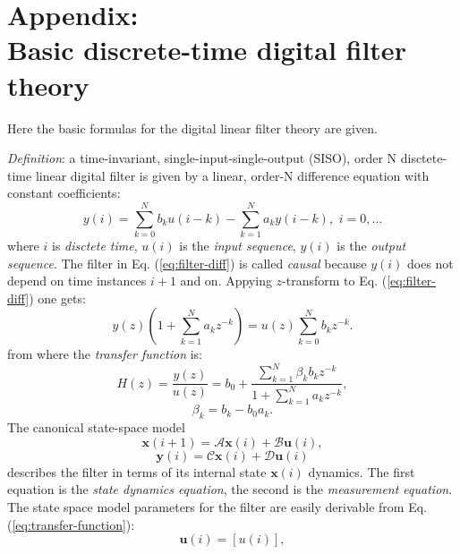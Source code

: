 
\newpage
\section{Appendix: \\ Basic discrete-time digital filter theory}
\label{app:DF}

\mbox{}

Here the basic formulas for the digital linear filter theory are given.

\emph{Definition}: a time-invariant, single-input-single-output (SISO), order N
disctete-time linear digital filter is given by a
linear, order-N difference equation with constant coefficients:
\begin{equation} \label{eq:filter-diff}
	y(i) = \sum_{k=0}^{N} b_{k} u(i-k) - \sum_{k=1}^{N} a_{k} y(i-k), \,\,
	i = 0,...
\end{equation}
where $i$ is \emph{disctete time},  $u(i)$ is the
\emph{input sequence},  $y(i)$ is the \emph{output
sequence}. 
The filter in Eq. (\ref{eq:filter-diff}) is called \emph{causal}  because
$y(i)$ does not depend on time instances $i+1$ and on. Appying $z$-transform
to Eq. (\ref{eq:filter-diff}) one gets:
$$ y(z) (1+\sum_{k=1}^{N} a_{k} z^{-k}) = u(z) \sum_{k=0}^{N} b_{k} z^{-k}. $$
from where the \emph{transfer function}  is:
\begin{equation} \label{eq:transfer-function}
	H(z) = \frac{y(z)}{u(z)} = b_{0} + \frac{\sum_{k=1}^{N} \beta_{k} b_{k}
	z^{-k}}{1+\sum_{k=1}^{N} a_{k} z^{-k}},
\end{equation}
$$ \beta_{k} = b_{k} - b_{0} a_{k}. $$
The canonical state-space model
\begin{equation} \label{eq:canonical-state-space}
	\bm{x}(i+1) = \mathcal{A} \bm{x}(i) + \mathcal{B} \bm{u}(i),
\end{equation}
$$ \bm{y}(i) = \mathcal{C} \bm{x}(i) + \mathcal{D} \bm{u}(i) $$
describes the filter in terms of its internal state $\bm{x}(i)$ dynamics. The
first equation is the \emph{state dynamics equation},  the second is the \emph{measurement equation}. 
The state space model parameters for the filter are easily derivable from Eq.
(\ref{eq:transfer-function}):
\begin{equation} \label{eq:state-space-filter}
	\bm{u}(i) = [u(i)],
\end{equation}
